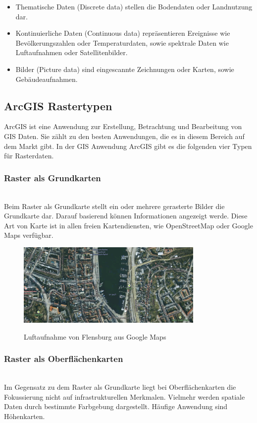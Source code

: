 \documentclass[10pt,conference,compsocconf]{IEEEtran}
\begin{document}
\begin{itemize}
  \item Thematische Daten (Discrete data) stellen die Bodendaten oder Landnutzung dar.
  \item Kontinuierliche Daten (Continuous data) repräsentieren Ereignisse wie Bevölkerungszahlen oder Temperaturdaten, sowie spektrale Daten wie Luftaufnahmen oder Satellitenbilder.
  \item Bilder (Picture data) sind eingescannte Zeichnungen oder Karten, sowie Gebäudeaufnahmen.\\
\end{itemize}

\subsection{ArcGIS Rastertypen}
ArcGIS ist eine Anwendung zur Erstellung, Betrachtung und Bearbeitung von GIS Daten. Sie zählt zu den besten Anwendungen, die es in diesem Bereich auf dem Markt gibt. In der GIS Anwendung ArcGIS gibt es die folgenden vier Typen für Rasterdaten.\\

\subsubsection{Raster als Grundkarten}\hspace*{\fill} \\
Beim Raster als Grundkarte stellt ein oder mehrere gerasterte Bilder die Grundkarte dar. Darauf basierend können Informationen angezeigt werde. Diese Art von Karte ist in allen freien Kartendiensten, wie OpenStreetMap oder Google Maps verfügbar.

\begin{figure}[H]
  \centering
  	\includegraphics[height=114pt]{img/gis_Flensburg_raster}\\
  \caption[]{Luftaufnahme von Flensburg aus Google Maps}
  \label{img:gis_Flensburg_raster}
\end{figure}

\subsubsection{Raster als Oberflächenkarten}\hspace*{\fill} \\
Im Gegensatz zu dem Raster als Grundkarte liegt bei Oberflächenkarten die Fokussierung nicht auf infrastrukturellen Merkmalen. Vielmehr werden spatiale Daten durch bestimmte Farbgebung dargestellt. Häufige Anwendung sind Höhenkarten.
\end{document}
